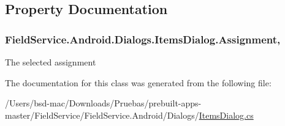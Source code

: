 \subsection{Property Documentation}
\hypertarget{class_field_service_1_1_android_1_1_dialogs_1_1_items_dialog_acf190fcd4177dc635e304b39bc896e7d}{
\subsubsection[{Assignment}]{ Field\+Service.\+Android.\+Dialogs.\+Items\+Dialog.\+Assignment\hspace{0.3cm}{\ttfamily [get]}, {\ttfamily [set]}}}\label{class_field_service_1_1_android_1_1_dialogs_1_1_items_dialog_acf190fcd4177dc635e304b39bc896e7d}


The selected assignment 



The documentation for this class was generated from the following file\+:\begin{DoxyCompactItemize}
\item 
/\+Users/bsd-\/mac/\+Downloads/\+Pruebas/prebuilt-\/apps-\/master/\+Field\+Service/\+Field\+Service.\+Android/\+Dialogs/\hyperlink{_items_dialog_8cs}{Items\+Dialog.\+cs}\end{DoxyCompactItemize}
